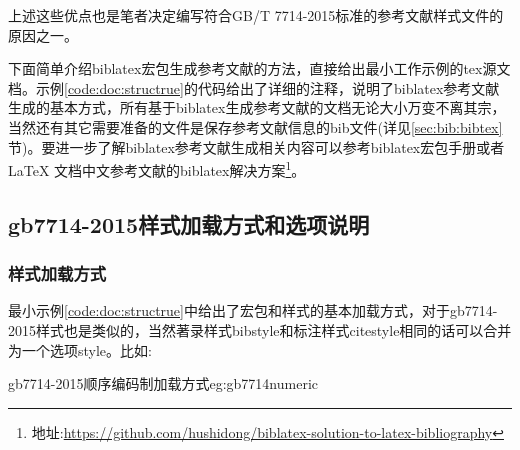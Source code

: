 上述这些优点也是笔者决定编写符合GB/T 7714-2015标准的参考文献样式文件的原因之一。

下面简单介绍biblatex宏包生成参考文献的方法，直接给出最小工作示例的tex源文档。示例\ref{code:doc:structrue}的代码给出了详细的注释，说明了biblatex参考文献生成的基本方式，所有基于biblatex生成参考文献的文档无论大小万变不离其宗，当然还有其它需要准备的文件是保存参考文献信息的bib文件(详见\ref{sec:bib:bibtex}节)。要进一步了解biblatex参考文献生成相关内容可以参考biblatex宏包手册或者LaTeX 文档中文参考文献的biblatex解决方案\footnote{地址:\url{https://github.com/hushidong/biblatex-solution-to-latex-bibliography}}。



\subsection{gb7714-2015样式加载方式和选项说明}
\subsubsection{样式加载方式}
最小示例\ref{code:doc:structrue}中给出了宏包和样式的基本加载方式，对于gb7714-2015样式也是类似的，当然著录样式bibstyle和标注样式citestyle相同的话可以合并为一个选项style。比如:

\begin{codetex}{gb7714-2015顺序编码制加载方式}{eg:gb7714numeric}
\usepackage[backend=biber,style=gb7714-2015]{biblatex}
\usepackage[backend=biber,style=gb7714-2015,align=left,gbpub=true]{biblatex}
\end{codetex}

